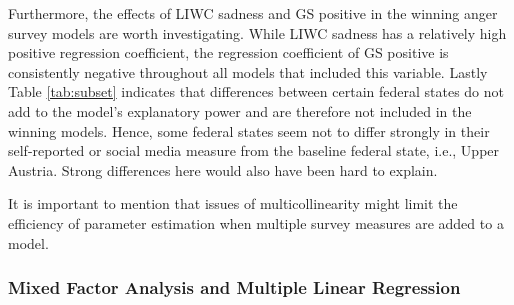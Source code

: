 \documentclass[
  english,
  jou,floatsintext]{apa7}
\begin{document}
Furthermore, the effects of LIWC sadness and GS positive in the winning anger survey models are worth investigating. While LIWC sadness has a relatively high positive regression coefficient, the regression coefficient of GS positive is consistently negative throughout all models that included this variable.
Lastly Table \ref{tab:subset} indicates that differences between certain federal states do not add to the model's explanatory power and are therefore not included in the winning models. Hence, some federal states seem not to differ strongly in their self-reported or social media measure from the baseline federal state, i.e., Upper Austria. Strong differences here would also have been hard to explain.

It is important to mention that issues of multicollinearity might limit the efficiency of parameter estimation when multiple survey measures are added to a model.

\hypertarget{mixed-factor-analysis-and-multiple-linear-regression-1}{%
\subsubsection{Mixed Factor Analysis and Multiple Linear Regression}\label{mixed-factor-analysis-and-multiple-linear-regression-1}}
\end{document}

